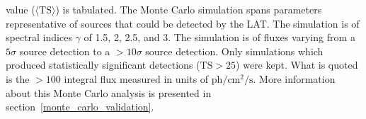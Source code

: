 \documentclass[12pt,preprint]{aastex}
\newcommand{\mev}{\text{MeV}\xspace}
\newcommand{\ph}{\text{ph}\xspace}
\newcommand{\cm}{\text{cm}\xspace}
\renewcommand{\sec}{\text{s}\xspace}
\newcommand{\ts}{\text{TS}\xspace}
\begin{document}
\begin{table}
\begin{centering}
{    value ($\langle\ts\rangle$) is tabulated.  The Monte Carlo simulation
    spans parameters representative of sources that could be detected
    by the LAT.  The simulation is of spectral indices $\gamma$ of 1.5,
    2, 2.5, and 3.  The simulation is of fluxes varying from a $5\sigma$
    source detection to a $>10\sigma$ source detection.  Only simulations
    which produced statistically significant detections ($\ts>25$)
    were kept.  What is quoted is the $>100$ \mev integral flux measured
    in units of $\ph/\cm^2/\sec$.  More information about this Monte
    Carlo analysis is presented in section~\ref{monte_carlo_validation}.
    }\label{ts_ext_num_sims}
  \end{centering}
\end{table}

\clearpage
\end{document}
